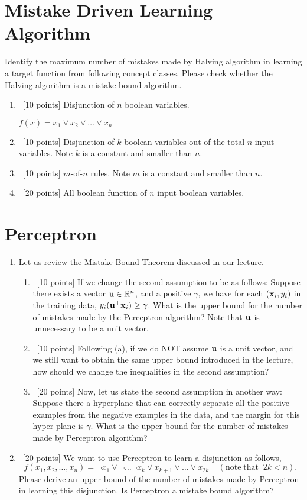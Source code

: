 \documentclass[12pt, fullpage,letterpaper]{article}
\begin{document}
\section{Mistake Driven Learning Algorithm}
Identify the maximum number of mistakes made by Halving algorithm in learning a target function from following concept classes. Please check whether the Halving algorithm is a mistake bound algorithm.
\begin{enumerate}
\item~[10 points] Disjunction of $n$ boolean variables.

    $f(x) = x_1 \lor x_2 \lor \dots \lor x_n$

\item~[10 points] Disjunction of $k$ boolean variables out of the total $n$ input variables. Note $k$ is a constant and smaller than $n$.
\item~[10 points] $m$-of-$n$ rules. Note $m$ is a constant and smaller than $n$.
\item~[20 points] All boolean function of $n$ input boolean variables.
\end{enumerate}

\section{Perceptron}
\begin{enumerate}
\item  Let us review the Mistake Bound Theorem discussed in our lecture.
\begin{enumerate}
	\item~[10 points] If we change the second assumption to be as follows: Suppose there exists a vector ${\bf u}\in \mathbb{R}^n$, and a positive $\gamma$, we have for each $({\bf x}_i, y_i)$ in the training data, $y_i({\bf u}^\top {\bf x}_i) \ge \gamma$. What is the upper bound for the number of mistakes made by the Perceptron algorithm?   Note that ${\bf u}$ is unnecessary to be a unit vector.



	\item~[10 points] Following (a), if we do NOT assume ${\bf u}$ is a unit vector, and we still want to obtain the same upper bound introduced in the lecture, how should we change the inequalities in the second assumption?
	\item~[20 points]  Now, let us state the second assumption in another way: Suppose there a hyperplane that can correctly separate all the positive examples from the negative examples in the data, and the margin for this hyper plane is $\gamma$. What is the upper bound for the number of mistakes made by Perceptron algorithm?
\end{enumerate}

\item~[20 points] We want to use Perceptron to learn a disjunction as follows,
\[
f(x_1, x_2, \ldots, x_n) = \neg x_1 \lor \neg \ldots \neg x_k \lor x_{k+1} \lor \ldots \lor x_{2k} \;\;\;\;(\mathrm{note\; that}\;\; 2k < n).
\]
Please derive an upper bound of the number of mistakes made by Perceptron in learning this disjunction. Is Perceptron a mistake bound algorithm?
\end{enumerate}
\end{document}
